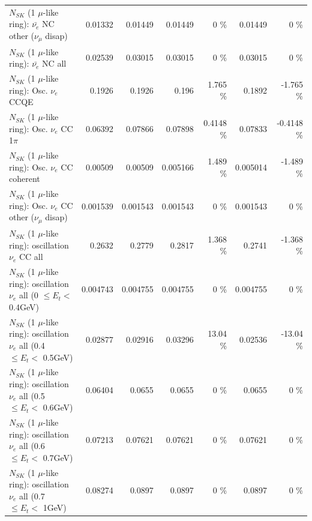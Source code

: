 \begin{table}
\begin{tabular}{| l | r | r | r  r | r  r |}
          $N_{SK}$ (1 $\mu$-like ring): $\bar{\nu_e}$ NC other ($\nu_\mu$ disap) &         0.01332 &         0.01449 &         0.01449 &        0 \%  &         0.01449 &        0 \%  \\ 
                            $N_{SK}$ (1 $\mu$-like ring): $\bar{\nu_{e}}$ NC all &         0.02539 &         0.03015 &         0.03015 &        0 \%  &         0.03015 &        0 \%  \\ 
\hline
\hline
\hline
                                 $N_{SK}$ (1 $\mu$-like ring): Osc. $\nu_e$ CCQE &          0.1926 &          0.1926 &           0.196 &    1.765 \%  &          0.1892 &   -1.765 \%  \\ 
                            $N_{SK}$ (1 $\mu$-like ring): Osc. $\nu_e$ CC 1$\pi$ &         0.06392 &         0.07866 &         0.07898 &   0.4148 \%  &         0.07833 &  -0.4148 \%  \\ 
                          $N_{SK}$ (1 $\mu$-like ring): Osc. $\nu_e$ CC coherent &         0.00509 &         0.00509 &        0.005166 &    1.489 \%  &        0.005014 &   -1.489 \%  \\ 
           $N_{SK}$ (1 $\mu$-like ring): Osc. $\nu_e$ CC other ($\nu_\mu$ disap) &        0.001539 &        0.001543 &        0.001543 &        0 \%  &        0.001543 &        0 \%  \\ 
                        $N_{SK}$ (1 $\mu$-like ring): oscillation $\nu_e$ CC all &          0.2632 &          0.2779 &          0.2817 &    1.368 \%  &          0.2741 &   -1.368 \%  \\ 
\hline
$N_{SK}$ (1 $\mu$-like ring): oscillation $\nu_{e}$ all (0 $\leq E_{t} <$ 0.4GeV) &        0.004743 &        0.004755 &        0.004755 &        0 \%  &        0.004755 &        0 \%  \\ 
$N_{SK}$ (1 $\mu$-like ring): oscillation $\nu_{e}$ all (0.4 $\leq E_{t} <$ 0.5GeV) &         0.02877 &         0.02916 &         0.03296 &    13.04 \%  &         0.02536 &   -13.04 \%  \\ 
$N_{SK}$ (1 $\mu$-like ring): oscillation $\nu_{e}$ all (0.5 $\leq E_{t} <$ 0.6GeV) &         0.06404 &          0.0655 &          0.0655 &        0 \%  &          0.0655 &        0 \%  \\ 
$N_{SK}$ (1 $\mu$-like ring): oscillation $\nu_{e}$ all (0.6 $\leq E_{t} <$ 0.7GeV) &         0.07213 &         0.07621 &         0.07621 &        0 \%  &         0.07621 &        0 \%  \\ 
$N_{SK}$ (1 $\mu$-like ring): oscillation $\nu_{e}$ all (0.7 $\leq E_{t} <$ 1GeV) &         0.08274 &          0.0897 &          0.0897 &        0 \%  &          0.0897 &        0 \%  \\ 

\end{tabular}
\end{table}

